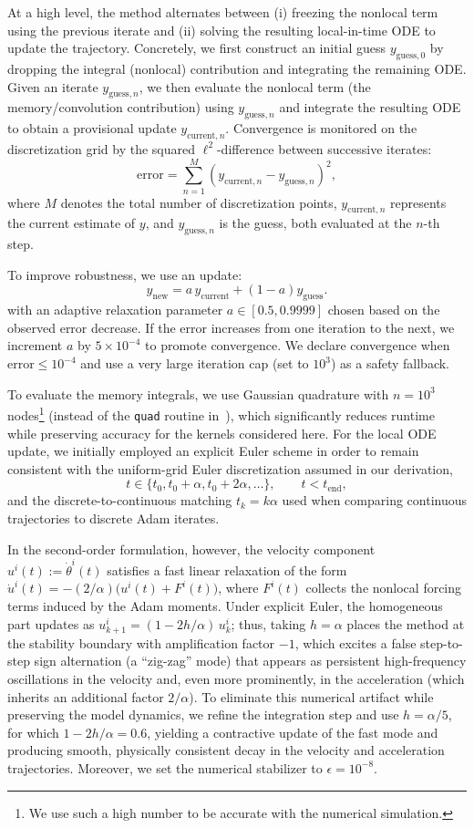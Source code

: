 \documentclass{article} %
\begin{document}
At a high level, the method alternates between (i) freezing the nonlocal term using the previous iterate and (ii) solving the resulting local-in-time ODE to update the trajectory. Concretely, we first construct an initial guess $y_{\text{guess},0}$ by dropping the integral (nonlocal) contribution and integrating the remaining ODE. Given an iterate $y_{\text{guess},n}$, we then evaluate the nonlocal term (the memory/convolution contribution) using $y_{\text{guess},n}$ and integrate the resulting ODE to obtain a provisional update $y_{\text{current}, n}$. Convergence is monitored on the discretization grid by the squared $\ell^2$-difference between successive iterates:
\[
\text{error} = \sum_{n=1}^{M} \left( y_{\text{current},n} - y_{\text{guess},n} \right)^2,
\]
where \( M \) denotes the total number of discretization points,  \( y_{\text{current},n} \) represents the current estimate of \( y \),  and \( y_{\text{guess},n} \) is the guess, both evaluated at the \( n \)-th step.

To improve robustness, we use an update:
\[
y_{\text{new}} = a\,y_{\text{current}} + (1 - a) y_{\text{guess}}.
\]
with an adaptive relaxation parameter $a\in[0.5,0.9999]$ chosen based on the observed error decrease. If the error increases from one iteration to the next, we increment $a$ by $5\times 10^{-4}$ to promote convergence. We declare convergence when $\text{error} \le 10^{-4}$ and use a very large iteration cap (set to $10^{3}$) as a safety fallback.

To evaluate the memory integrals, we use Gaussian quadrature with $n=10^3$ nodes\footnote{We use such a high number to be accurate with the numerical simulation.} (instead of the \texttt{quad} routine in~\cite{GELMI2014}), which significantly reduces runtime while preserving accuracy for the kernels considered here. For the local ODE update, we initially employed an explicit Euler scheme in order to remain consistent with the uniform-grid Euler discretization assumed in our derivation,
\[
t \in \{t_0, t_0+\alpha, t_0+2\alpha, \dots\}, \qquad t < t_{\text{end}},
\]
and the discrete-to-continuous matching $t_k = k\alpha$ used when comparing continuous trajectories to discrete Adam iterates.

In the second-order formulation, however, the velocity component $u^i(t):=\dot \theta^i(t)$ satisfies a fast linear relaxation of the form \(\dot u^i(t)=-(2/\alpha)\bigl(u^i(t)+F^i(t)\bigr)\), where $F^i(t)$ collects the nonlocal forcing terms induced by the Adam moments. Under explicit Euler, the homogeneous part updates as \(u^i_{k+1}=(1-2h/\alpha)\,u^i_k\); thus, taking $h=\alpha$ places the method at the stability boundary with amplification factor $-1$, which excites a false step-to-step sign alternation (a ``zig-zag'' mode) that appears as persistent high-frequency oscillations in the velocity and, even more prominently, in the acceleration (which inherits an additional factor $2/\alpha$). To eliminate this numerical artifact while preserving the model dynamics, we refine the integration step and use $h=\alpha/5$, for which \(1-2h/\alpha=0.6\), yielding a contractive update of the fast mode and producing smooth, physically consistent decay in the velocity and acceleration trajectories. Moreover, we set the numerical stabilizer to $\epsilon = 10^{-8}$.
\end{document}
